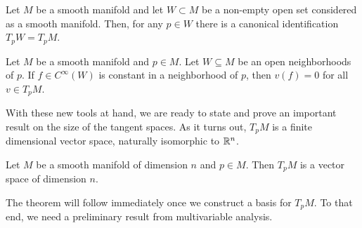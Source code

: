 \begin{cor}\label{cor:tgsubspace}
    Let $M$ be a smooth manifold and let $W\subset M$ be a non-empty open set considered as a smooth manifold.
    Then, for any $p\in W$ there is a canonical identification $T_pW = T_p M$.
\end{cor}

\begin{cor}\label{cor:derzero}
    Let $M$ be a smooth manifold and $p\in M$.
    Let $W\subseteq M$ be an open neighborhoods of $p$.
    If $f\in C^\infty(W)$ is constant in a neighborhood of $p$, then $v(f) = 0$ for all $v\in T_p M$.
\end{cor}

With these new tools at hand, we are ready to state and prove an important result on the size of the tangent spaces.
As it turns out, $T_pM$ is a finite dimensional vector space, naturally isomorphic to $\mathbb{R}^n$.

\begin{thm}\label{thm:dimensionTpM}
    Let $M$ be a smooth manifold of dimension $n$ and $p\in M$.
    Then $T_pM$ is a vector space of dimension $n$.
\end{thm}

The theorem will follow immediately once we construct a basis for $T_pM$.
To that end, we need a preliminary result from multivariable analysis.

